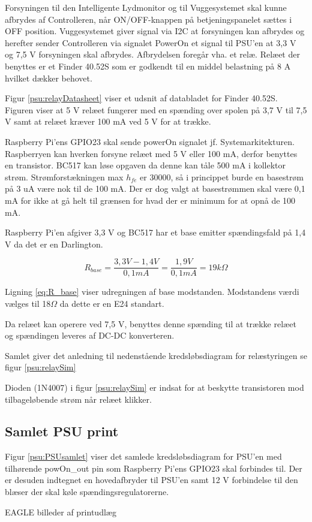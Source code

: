 Forsyningen til den Intelligente Lydmonitor og til Vuggesystemet skal kunne afbrydes af Controlleren, når ON/OFF-knappen på betjeningspanelet sættes i OFF position. Vuggesystemet giver signal via I2C at forsyningen kan afbrydes og herefter sender Controlleren via signalet PowerOn et signal til PSU'en at 3,3 V og 7,5 V forsyningen skal afbrydes. Afbrydelsen foregår vha. et relæ. Relæet der benyttes er et Finder 40.52S som er godkendt til en middel belastning på 8 A hvilket dækker behovet. 


Figur \ref{psu:relayDatasheet} viser et udsnit af databladet for Finder 40.52S. Figuren viser at 5 V relæet fungerer med en spænding over spolen på 3,7 V til 7,5 V samt at relæet kræver 100 mA ved 5 V for at trække.

Raspberry Pi'ens GPIO23 skal sende powerOn signalet jf. Systemarkitekturen. Raspberryen kan hverken forsyne relæet med 5 V eller 100 mA, derfor benyttes en transistor. BC517 kan løse opgaven da denne kan tåle 500 mA i kollektor strøm. Strømforstækningen max $h_{fe}$ er 30000, så i princippet burde en basestrøm på 3 uA være nok til de 100 mA. Der er dog valgt at basestrømmen skal være 0,1 mA for ikke at gå helt til grænsen for hvad der er minimum for at opnå de 100 mA. 

Raspberry Pi'en afgiver 3,3 V og BC517 har et base emitter spændingsfald på 1,4 V da det er en Darlington. 

\begin{equation}
{ R }_{ base }=\frac { 3,3V-1,4V }{ 0,1mA } =\frac { 1,9V }{ 0,1mA } =19k\Omega
\label{eq:R_base}
\end{equation}

Ligning \ref{eq:R_base} viser udregningen af base modstanden. Modstandens værdi vælges til 18$\Omega$ da dette er en E24 standart.  

Da relæet kan operere ved 7,5 V, benyttes denne spænding til at trække relæet og spændingen leveres af DC-DC konverteren. 

Samlet giver det anledning til nedenstående kredsløbsdiagram for relæstyringen se figur \ref{psu:relaySim}


Dioden (1N4007) i figur \ref{psu:relaySim} er indsat for at beskytte transistoren mod tilbageløbende strøm når relæet klikker. 


\subsection{Samlet PSU print}


Figur \ref{psu:PSUsamlet} viser det samlede kredsløbsdiagram for PSU'en med tilhørende powOn\_out pin som Raspberry Pi'ens GPIO23 skal forbindes til. Der er desuden indtegnet en hovedafbryder til PSU'en samt 12 V forbindelse til den blæser der skal køle spændingsregulatorerne.

EAGLE billeder af printudlæg 